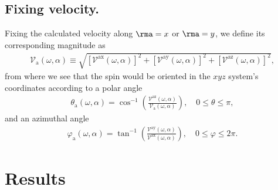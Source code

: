 \documentclass[floatfix,prb,aps,superscriptaddress,showpacs,11pt,preprint,letterpaper]{revtex4}
\begin{document}


\subsection{Fixing velocity.}\label{sec:theory-fixvel}

Fixing the calculated velocity along $\rma=x$ or $\rma=y$,
we define its corresponding magnitude as
\begin{align}
\mathcal{V}_{\mathrm{a}}(\omega,\alpha) \equiv 
\sqrt { 
[\mathcal{V}^{\mathrm{ax}}(\omega,\alpha)]^{2} +
[\mathcal{V}^{\mathrm{ay}}(\omega,\alpha)]^{2} +
[\mathcal{V}^{\mathrm{az}}(\omega,\alpha)]^{2} 
},
\label{eq:vv-mag}
\end{align}
from where we see that the spin would be oriented
in the $xyz$ system's coordinates
according to a polar angle
\begin{align}
\theta_{\mathrm{a}}  (\omega,\alpha)
= 
\cos^{-1} \left( \frac{\mathcal{V}^{\mathrm{az}}(\omega,\alpha)}
{\mathcal{V}_{\mathrm{a}}(\omega,\alpha)} \right),
 \quad 0 \leq \theta \leq \pi, 
\label{eq:polar-ang}
\end{align}
and an azimuthal angle
\begin{align}
\varphi_{\mathrm{a}} (\omega,\alpha)
=
\tan^{-1} \left( \frac{\mathcal{V}^{\mathrm{ay}}(\omega,\alpha)}
{\mathcal{V}^{\mathrm{ax}}(\omega,\alpha)} \right),
\quad 0 \leq \varphi \leq 2\pi.
\label{eq:azimuthal-ang} 
\end{align} 



\section{Results} %
\label{sec:results}
\end{document}
